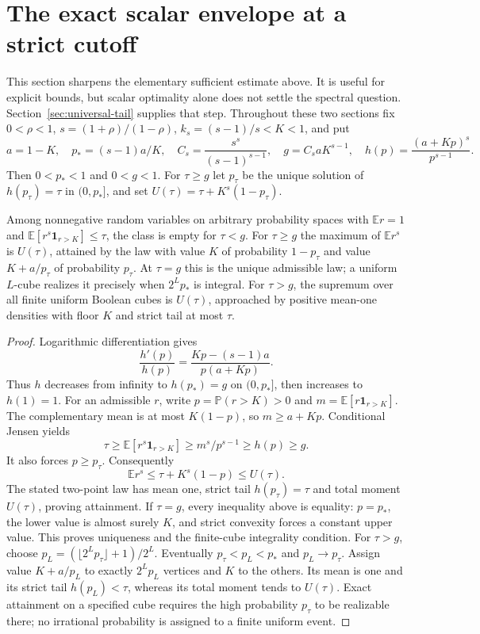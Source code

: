 \section{The exact scalar envelope at a strict cutoff}\label{sec:scalar-envelope}
This section sharpens the elementary sufficient estimate above. It is
useful for explicit bounds, but scalar optimality alone does not settle
the spectral question. Section~\ref{sec:universal-tail} supplies that step.
Throughout these two sections fix $0<\rho<1$, $s=(1+\rho)/(1-\rho)$,
$k_s=(s-1)/s<K<1$, and put
\[
 a=1-K,\quad p_*=(s-1)a/K,\quad C_s=\frac{s^s}{(s-1)^{s-1}},
 \quad g=C_saK^{s-1},\quad h(p)=\frac{(a+Kp)^s}{p^{s-1}}.
\]
Then $0<p_*<1$ and $0<g<1$. For $\tau\ge g$ let $p_\tau$ be the
unique solution of $h(p_\tau)=\tau$ in $(0,p_*]$, and set
$U(\tau)=\tau+K^s(1-p_\tau)$.

\begin{theorem}\label{thm:scalar-envelope}
Among nonnegative random variables on arbitrary probability spaces with
$\mathbb Er=1$ and $\mathbb E[r^s\mathbf1_{r>K}]\le\tau$, the class is
empty for $\tau<g$. For $\tau\ge g$ the maximum of $\mathbb Er^s$ is
$U(\tau)$, attained by the law with value $K$ of probability $1-p_\tau$
and value $K+a/p_\tau$ of probability $p_\tau$.
At $\tau=g$ this is the unique admissible law; a uniform $L$-cube realizes
it precisely when $2^Lp_*$ is integral. For $\tau>g$, the supremum over
all finite uniform Boolean cubes is $U(\tau)$, approached by positive
mean-one densities with floor $K$ and strict tail at most $\tau$.
\end{theorem}
\begin{proof}
Logarithmic differentiation gives
\[
 \frac{h'(p)}{h(p)}=\frac{Kp-(s-1)a}{p(a+Kp)}.
\]
Thus $h$ decreases from infinity to $h(p_*)=g$ on $(0,p_*]$, then
increases to $h(1)=1$. For an admissible $r$, write
$p=\mathbb P(r>K)>0$ and $m=\mathbb E[r\mathbf1_{r>K}]$.
The complementary mean is at most $K(1-p)$, so $m\ge a+Kp$.
Conditional Jensen yields
\[
 \tau\ge\mathbb E[r^s\mathbf1_{r>K}]
 \ge m^s/p^{s-1}\ge h(p)\ge g.
\]
It also forces $p\ge p_\tau$. Consequently
\[
 \mathbb Er^s\le\tau+K^s(1-p)\le U(\tau).
\]
The stated two-point law has mean one, strict tail $h(p_\tau)=\tau$
and total moment $U(\tau)$, proving attainment. If $\tau=g$, every
inequality above is equality: $p=p_*$, the lower value is almost surely
$K$, and strict convexity forces a constant upper value. This proves
uniqueness and the finite-cube integrality condition.
For $\tau>g$, choose
$p_L=(\lfloor2^Lp_\tau\rfloor+1)/2^L$. Eventually
$p_\tau<p_L<p_*$ and $p_L\to p_\tau$. Assign value $K+a/p_L$ to
exactly $2^Lp_L$ vertices and $K$ to the others. Its mean is one and its
strict tail $h(p_L)<\tau$, whereas its total moment tends to $U(\tau)$.
Exact attainment on a specified cube requires the high probability
$p_\tau$ to be realizable there; no irrational probability is assigned
to a finite uniform event.
\end{proof}


